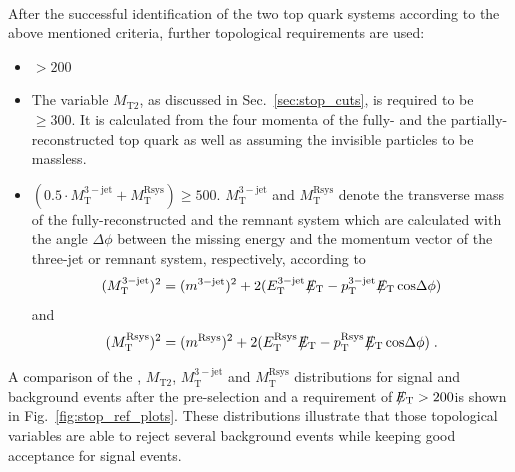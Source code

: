 \\
After the successful identification of the two top quark systems according to the above mentioned criteria, further topological requirements are used:
\begin{itemize}
 \item \met $> 200$\gev
 \item The variable $M_\mathrm{T2}$, as discussed in Sec.~\ref{sec:stop_cuts}, is required to be $\ge 300$\gev. It is calculated from the four momenta of the fully- and the partially-reconstructed top quark as well as \met assuming the invisible particles to be massless. 
 \item $(0.5 \cdot M_\mathrm{T}^\mathrm{3-jet} + M_\mathrm{T}^\mathrm{Rsys}) \ge 500$\gev. $ M_\mathrm{T}^\mathrm{3-jet}$ and $M_\mathrm{T}^\mathrm{Rsys}$ denote the transverse mass of the fully-reconstructed and the remnant system which are calculated with the angle $\Delta \phi$ between the missing energy and the momentum vector of the three-jet or remnant system, respectively, according to
\begin{equation*}
( M_\mathrm{T}^\mathrm{3-jet})^2 = (m^{3-\mathrm{jet}})^2 + 2(E_\mathrm{T}^\mathrm{3-jet} \, \slash\mkern-12mu{E}_{\text{T}} - p_\mathrm{T}^\mathrm{3-jet} \, \slash\mkern-12mu{E}_{\text{T}} \, \mathrm{cos} \Delta \phi)
\end{equation*} 
and 
\begin{equation*}
( M_\mathrm{T}^\mathrm{Rsys})^2 = (m^\mathrm{Rsys})^2 + 2(E_\mathrm{T}^\mathrm{Rsys} \, \slash\mkern-12mu{E}_{\text{T}} - p_\mathrm{T}^\mathrm{Rsys} \, \slash\mkern-12mu{E}_{\text{T}} \, \mathrm{cos} \Delta \phi) \; .
\end{equation*} 
\end{itemize}
A comparison of the \met, $M_\mathrm{T2}$, $M_\mathrm{T}^\mathrm{3-jet}$ and $M_\mathrm{T}^\mathrm{Rsys}$ distributions for signal and background events after the pre-selection and a requirement of $\slash\mkern-12mu{E}_{\text{T}} > 200$\gev is shown in Fig.~\ref{fig:stop_ref_plots}. These distributions illustrate that those topological variables are able to reject several background events while keeping good acceptance for signal events. %
